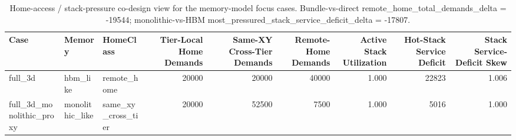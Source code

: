 \begin{table}[t]
  \centering
  \caption{Home-access / stack-pressure co-design view for the memory-model focus cases. Bundle-vs-direct remote\_home\_total\_demands\_delta = -19544; monolithic-vs-HBM most\_pressured\_stack\_service\_deficit\_delta = -17807.}
  \begin{tabular}{l l l r r r r r r}
  \hline
  Case & Memory & HomeClass & Tier-Local Home Demands & Same-XY Cross-Tier Demands & Remote-Home Demands & Active Stack Utilization & Hot-Stack Service Deficit & Stack Service-Deficit Skew \\
  \hline
  full\_3d & hbm\_like & remote\_home & 20000 & 20000 & 40000 & 1.000 & 22823 & 1.006 \\
  full\_3d\_monolithic\_proxy & monolithic\_like & same\_xy\_cross\_tier & 20000 & 52500 & 7500 & 1.000 & 5016 & 1.000 \\
  \hline
  \end{tabular}
\end{table}
